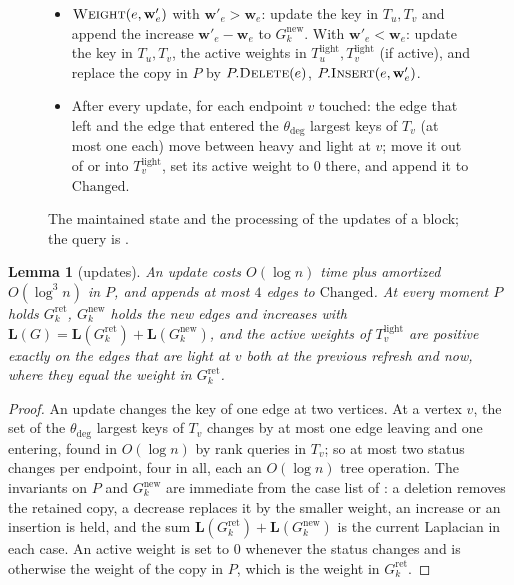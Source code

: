 \documentclass[11pt]{article}
\newtheorem{lemma}[theorem]{Lemma}
\theoremstyle{remark}
\newcommand{\LL}{\mathbf L}
\newcommand{\ww}{\mathbf w}
\newcommand{\dheavy}{\theta_{\deg}}
\newcommand{\Gret}{G^{\mathrm{ret}}}
\newcommand{\Gnew}{G^{\mathrm{new}}}
\begin{document}
\begin{figure}[H]
{\begin{minipage}{0.96\linewidth}
\begin{itemize}[leftmargin=*,itemsep=1pt]
$T^{\mathrm{light}}_u,T^{\mathrm{light}}_v$, from $\Gnew_k$ if present, and
$P.\textsc{Delete}(e)$ if present.
\item $\textsc{Weight}(e,\ww'_e)$ with $\ww'_e>\ww_e$: update the key in
$T_u,T_v$ and append the increase $\ww'_e-\ww_e$ to $\Gnew_k$.
With $\ww'_e<\ww_e$: update the key in $T_u,T_v$, the active weights in
$T^{\mathrm{light}}_u,T^{\mathrm{light}}_v$ (if active), and replace the copy in
$P$ by $P.\textsc{Delete}(e)$, $P.\textsc{Insert}(e,\ww'_e)$.
\item After every update, for each endpoint $v$ touched: the edge that left
and the edge that entered the $\dheavy$ largest keys of $T_v$ (at most one
each) move between heavy and light at $v$; move it out of or into
$T^{\mathrm{light}}_v$, set its active weight to $0$ there, and append it to
$\mathrm{Changed}$.
\end{itemize}
\end{minipage}}
\caption{The maintained state and the processing of the updates of a block;
the query is .}
\label{fig:state}
\end{figure}

\begin{lemma}[updates]\label{lem:updates}
An update costs $O(\log n)$ time plus amortized $O(\log^{3}n)$ in $P$, and
appends at most $4$ edges to $\mathrm{Changed}$.
At every moment $P$ holds $\Gret_k$, $\Gnew_k$ holds the new edges and
increases with $\LL(G)=\LL(\Gret_k)+\LL(\Gnew_k)$, and the active weights of
$T^{\mathrm{light}}_v$ are positive exactly on the edges that are light at
$v$ both at the previous refresh and now, where they equal the weight in
$\Gret_k$.
\end{lemma}
\begin{proof}
An update changes the key of one edge at two vertices.
At a vertex $v$, the set of the $\dheavy$ largest keys of $T_v$ changes by at
most one edge leaving and one entering, found in $O(\log n)$ by rank
queries in $T_v$; so at most two status changes per endpoint, four in all,
each an $O(\log n)$ tree operation.
The invariants on $P$ and $\Gnew_k$ are immediate from the case list of
: a deletion removes the retained copy, a decrease replaces
it by the smaller weight, an increase or an insertion is held, and the sum
$\LL(\Gret_k)+\LL(\Gnew_k)$ is the current Laplacian in each case.
An active weight is set to $0$ whenever the status changes and is otherwise
the weight of the copy in $P$, which is the weight in $\Gret_k$.
\end{proof}
\end{document}
